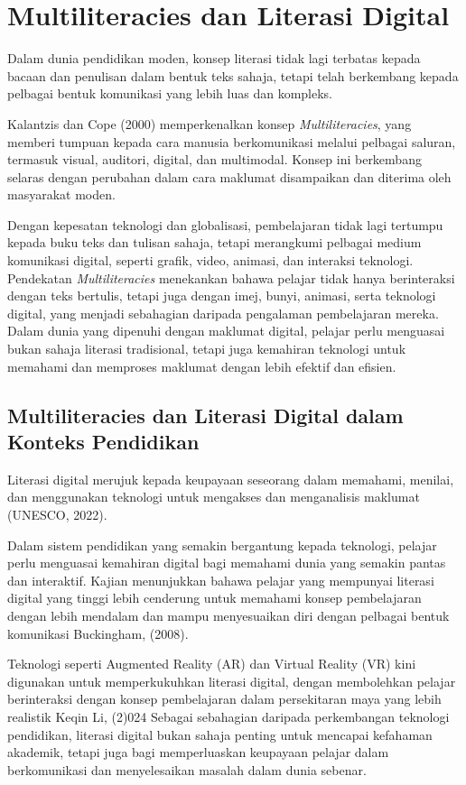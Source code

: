 \section{Multiliteracies dan Literasi Digital}

Dalam dunia pendidikan moden, konsep literasi tidak lagi terbatas kepada bacaan dan penulisan dalam bentuk teks sahaja, tetapi telah berkembang kepada pelbagai bentuk komunikasi yang lebih luas dan kompleks.

Kalantzis dan Cope (2000) memperkenalkan konsep \textit{Multiliteracies}, yang memberi tumpuan kepada cara manusia berkomunikasi melalui pelbagai saluran, termasuk visual, auditori, digital, dan multimodal. Konsep ini berkembang selaras dengan perubahan dalam cara maklumat disampaikan dan diterima oleh masyarakat moden.

\hspace{1cm}Dengan kepesatan teknologi dan globalisasi, pembelajaran tidak lagi tertumpu kepada buku teks dan tulisan sahaja, tetapi merangkumi pelbagai medium komunikasi digital, seperti grafik, video, animasi, dan interaksi teknologi.
Pendekatan\textit{ Multiliteracies }menekankan bahawa pelajar tidak hanya berinteraksi dengan teks bertulis, tetapi juga dengan imej, bunyi, animasi, serta teknologi digital, yang menjadi sebahagian daripada pengalaman pembelajaran mereka. Dalam dunia yang dipenuhi dengan maklumat digital, pelajar perlu menguasai bukan sahaja literasi tradisional, tetapi juga kemahiran teknologi untuk memahami dan memproses maklumat dengan lebih efektif dan efisien.

\subsection{Multiliteracies dan Literasi Digital dalam Konteks Pendidikan}
Literasi digital merujuk kepada keupayaan seseorang dalam memahami, menilai, dan menggunakan teknologi untuk mengakses dan menganalisis maklumat (UNESCO, 2022).

Dalam sistem pendidikan yang semakin bergantung kepada teknologi, pelajar perlu menguasai kemahiran digital bagi memahami dunia yang semakin pantas dan interaktif. Kajian menunjukkan bahawa pelajar yang mempunyai literasi digital yang tinggi lebih cenderung untuk memahami konsep pembelajaran dengan lebih mendalam dan mampu menyesuaikan diri dengan pelbagai bentuk komunikasi Buckingham, (2008).

Teknologi seperti Augmented Reality (AR) dan Virtual Reality (VR) kini digunakan untuk memperkukuhkan literasi digital, dengan membolehkan pelajar berinteraksi dengan konsep pembelajaran dalam persekitaran maya yang lebih realistik Keqin Li, (2)024
Sebagai sebahagian daripada perkembangan teknologi pendidikan, literasi digital bukan sahaja penting untuk mencapai kefahaman akademik, tetapi juga bagi memperluaskan keupayaan pelajar dalam berkomunikasi dan menyelesaikan masalah dalam dunia sebenar.

